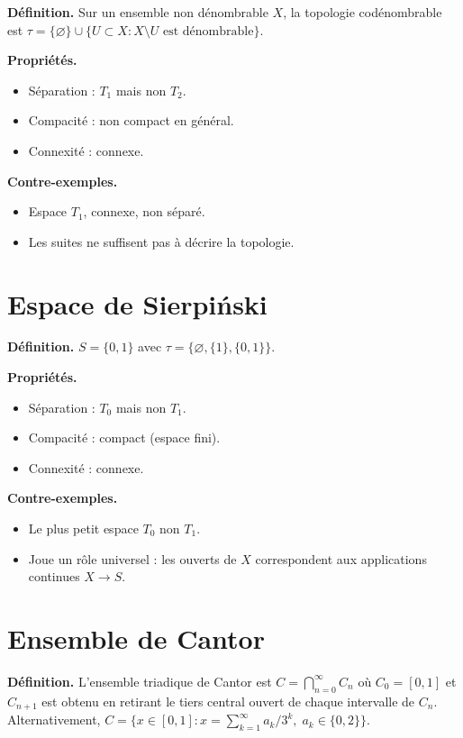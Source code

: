 \documentclass[12pt,a4paper,openany]{book}
\theoremstyle{definition}
\theoremstyle{cours}
\theoremstyle{coursnormal}
\begin{document}
\textbf{Définition.} Sur un ensemble non dénombrable $X$, la topologie
codénombrable est
$\tau=\{\varnothing\}\cup\{U\subset X: X\setminus U\text{ est
dénombrable}\}$.

\textbf{Propriétés.}
\begin{itemize}
  \item Séparation : $T_1$ mais non $T_2$.
  \item Compacité : non compact en général.
  \item Connexité : connexe.
\end{itemize}

\textbf{Contre-exemples.}
\begin{itemize}
  \item Espace $T_1$, connexe, non séparé.
  \item Les suites ne suffisent pas à décrire la topologie.
\end{itemize}

\section{Espace de Sierpiński}
\label{app:sierpinski}

\textbf{Définition.} $S=\{0,1\}$ avec $\tau=\{\varnothing,\{1\},\{0,1\}\}$.

\textbf{Propriétés.}
\begin{itemize}
  \item Séparation : $T_0$ mais non $T_1$.
  \item Compacité : compact (espace fini).
  \item Connexité : connexe.
\end{itemize}

\textbf{Contre-exemples.}
\begin{itemize}
  \item Le plus petit espace $T_0$ non $T_1$.
  \item Joue un rôle universel : les ouverts de $X$ correspondent aux
    applications continues $X\to S$.
\end{itemize}

\section{Ensemble de Cantor}
\label{app:cantor}

\textbf{Définition.} L'ensemble triadique de Cantor est
$C=\bigcap_{n=0}^{\infty}C_n$ où $C_0=[0,1]$ et $C_{n+1}$ est obtenu
en retirant le tiers central ouvert de chaque intervalle de $C_n$.
Alternativement, $C=\{x\in[0,1]: x=\sum_{k=1}^{\infty}a_k/3^k,\;
a_k\in\{0,2\}\}$.
\end{document}
